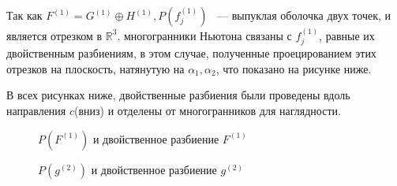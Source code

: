 \documentclass[russian]{lecture-notes}
\begin{document}
	Так как $F^{(1)} = G^{(1)} \oplus H^{(1)} ,P(f_j^{(1)})$ ~--- выпуклая оболочка двух точек, и является отрезком в $\mathbb{R}^3$. многогранники Ньютона связаны с $f_j^{(1)}$, равные их двойственным разбиениям, в этом случае, полученные проецированием этих отрезков на плоскость, натянутую на $\alpha_1, \alpha_2$, что показано на рисунке ниже.
	
	В всех рисунках ниже, двойственные разбиения были проведены вдоль направления $c$(вниз) и отделены от многогранников для наглядности.
	\begin{figure}[!h]
		\caption{$P(F^{(1)})$ и двойственное разбиение $F^{(1)}$}
		
	\end{figure}
	\begin{figure}[!ht]
		\caption{$P(g^{(2)})$ и двойственное разбиение $g^{(2)}$}
	\end{figure}
\end{document}
